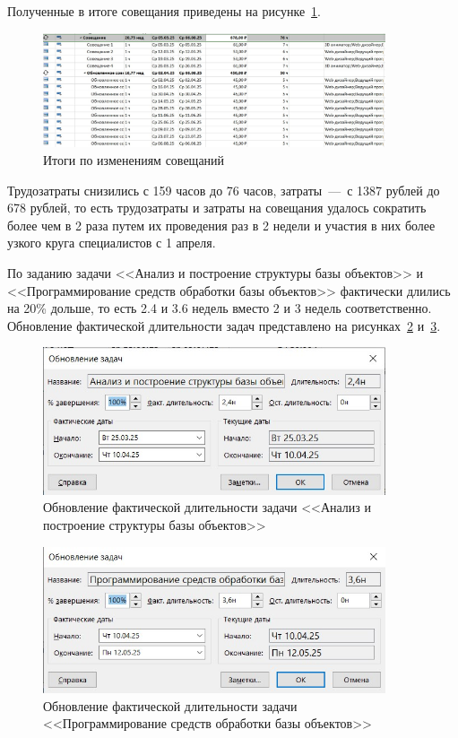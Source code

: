 Полученные в итоге совещания приведены на рисунке~\ref{fig:screen12}.

\begin{figure}[H]
	\centering
	\includegraphics[width=0.9\textwidth]{img/lab4/screen12.jpg}
	\caption{Итоги по изменениям совещаний}
	\label{fig:screen12}
\end{figure}

Трудозатраты снизились с 159 часов до 76 часов, затраты~---~с 1387 рублей до 678 рублей, то есть трудозатраты и затраты на совещания удалось сократить более чем в 2 раза путем их проведения раз в 2 недели и участия в них более узкого круга специалистов с 1 апреля.

По заданию задачи <<Анализ и построение структуры базы объектов>> и <<Программирование средств обработки базы объектов>> фактически длились на 20\% дольше, то есть 2.4 и 3.6 недель вместо 2 и 3 недель соответственно.
Обновление фактической длительности задач представлено на рисунках~\ref{fig:screen17} и~\ref{fig:screen18}.

\begin{figure}[H]
	\centering
	\includegraphics[width=0.9\textwidth]{img/lab4/screen17.jpg}
	\caption{Обновление фактической длительности задачи <<Анализ и построение структуры базы объектов>>}
	\label{fig:screen17}
\end{figure}

\begin{figure}[H]
	\centering
	\includegraphics[width=0.9\textwidth]{img/lab4/screen18.jpg}
	\caption{Обновление фактической длительности задачи <<Программирование средств обработки базы объектов>>}
	\label{fig:screen18}
\end{figure}

